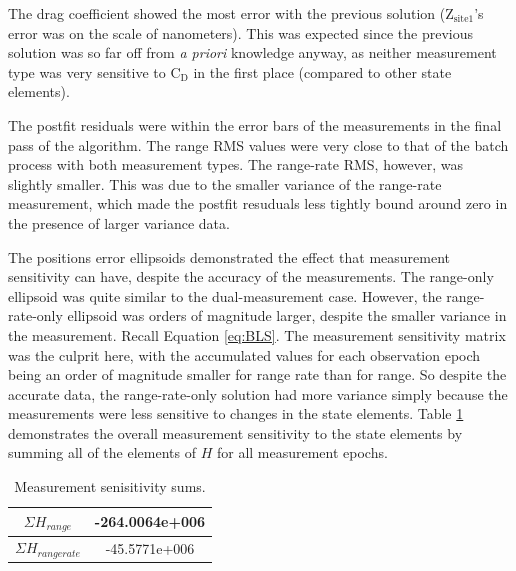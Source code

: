 \documentclass[]{aiaa-tc}%
\begin{document}
	The drag coefficient showed the most error with the previous solution (Z$_{\text{site1}}$'s error was on the scale of nanometers). This was expected since the previous solution was so far off from \textit{a priori} knowledge anyway, as neither measurement type was very sensitive to C$_{\text{D}}$ in the first place (compared to other state elements).
	
	\vspace{5 mm}

	The postfit residuals were within the error bars of the measurements in the final pass of the algorithm.  The range RMS values were very close to that of the batch process with both measurement types.  The range-rate RMS, however, was slightly smaller.  This was due to the smaller variance of the range-rate measurement, which made the postfit resuduals less tightly bound around zero in the presence of larger variance data.
	
	\vspace{5 mm}

	The positions error ellipsoids demonstrated the effect that measurement sensitivity can have, despite the accuracy of the measurements.  The range-only ellipsoid was quite similar to the dual-measurement case. However, the range-rate-only ellipsoid was orders of magnitude larger, despite the smaller variance in the measurement. Recall Equation \ref{eq:BLS}. The measurement sensitivity matrix was the culprit here, with the accumulated values for each observation epoch being an order of magnitude smaller for range rate than for range.  So despite the accurate data, the range-rate-only solution had more variance simply because the measurements were less sensitive to changes in the state elements.  Table \ref{t:Meas_sensitivity_sums} demonstrates the overall measurement sensitivity to the state elements by summing all of the elements of $H$ for all measurement epochs.  

	\begin{table}[H]%
		\begin{center}
			\caption{Measurement senisitivity sums.}
			\label{t:Meas_sensitivity_sums}
			\begin{tabular}{|c|c|}
\hline
$\Sigma H_{range}$         &     -264.0064e+006   \\ \hline
$\Sigma H_{range rate}$ &     -45.5771e+006  \\ \hline
			\end{tabular}
		\end{center}
	\end{table}  
	
\end{document}
